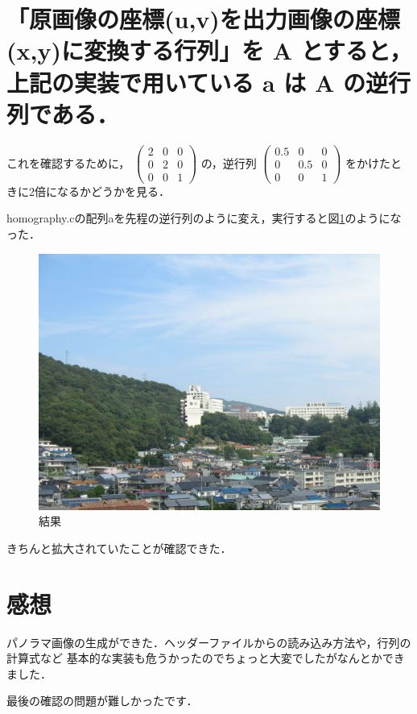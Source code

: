 \documentclass[11pt]{jarticle}
\begin{document}
\section{「原画像の座標(u,v)を出力画像の座標(x,y)に変換する行列」を A とすると，上記の実装で用いている a は A の逆行列である．}
これを確認するために，
    $ \left(
        \begin{array}{rrr}
        2 & 0 & 0 \\
        0 & 2 & 0 \\
        0 & 0 & 1
        \end{array}
    \right) $
の，逆行列
$ \left(
    \begin{array}{rrr}
    0.5 & 0 & 0 \\
    0 & 0.5 & 0 \\
    0 & 0 & 1
    \end{array}
\right) $
をかけたときに2倍になるかどうかを見る．

homography.cの配列aを先程の逆行列のように変え，実行すると図\ref{kakudai}のようになった．
\begin{figure}[h]
    \centering
    \includegraphics[scale=.2]{kakudai.jpg}
    \caption{結果}
    \label{kakudai}
\end{figure}

きちんと拡大されていたことが確認できた．
\section{感想}
パノラマ画像の生成ができた．ヘッダーファイルからの読み込み方法や，行列の計算式など
基本的な実装も危うかったのでちょっと大変でしたがなんとかできました．

最後の確認の問題が難しかったです．
\end{document}
